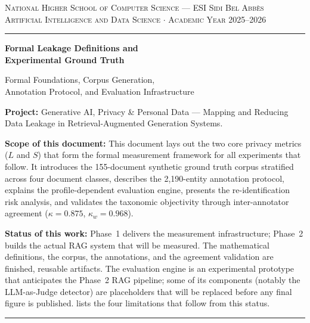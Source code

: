 \documentclass[12pt, a4paper]{article}
\begin{document}


\begin{titlepage}
\begin{center}

\vspace*{1.2cm}

{\small\color{steel}\textsc{National Higher School of Computer Science --- ESI Sidi Bel Abb\`{e}s}}\\[0.15cm]
{\small\color{steel}\textsc{Artificial Intelligence and Data Science $\cdot$ Academic Year 2025--2026}}

\vspace{0.5cm}
{\color{navy}\rule{\textwidth}{1.2pt}}
\vspace{1.6cm}

{\color{navy}\Huge\bfseries Formal Leakage Definitions and\\[0.3cm] Experimental Ground Truth}

\vspace{0.8cm}

{\color{steel}\large Formal Foundations, Corpus Generation,\\[0.1cm]
Annotation Protocol, and Evaluation Infrastructure}

\vspace{2cm}

\begin{prosebox}
{\small\textbf{Project:} Generative AI, Privacy \& Personal Data --- Mapping and Reducing Data Leakage in Retrieval-Augmented Generation Systems.

\medskip
\textbf{Scope of this document:} This document lays out the two core privacy metrics ($L$ and $S$) that form the formal measurement framework for all experiments that follow. It introduces the 155-document synthetic ground truth corpus stratified across four document classes, describes the 2{,}190-entity annotation protocol, explains the profile-dependent evaluation engine, presents the re-identification risk analysis, and validates the taxonomic objectivity through inter-annotator agreement ($\kappa = 0.875$, $\kappa_w = 0.968$).

\medskip
\textbf{Status of this work:} Phase~1 delivers the measurement infrastructure; Phase~2 builds the actual RAG system that will be measured. The mathematical definitions, the corpus, the annotations, and the agreement validation are finished, reusable artifacts. The evaluation engine is an experimental prototype that anticipates the Phase~2 RAG pipeline; some of its components (notably the LLM-as-Judge detector) are placeholders that will be replaced before any final figure is published.  lists the four limitations that follow from this status.}
\end{prosebox}

\vfill
{\color{navy}\rule{\textwidth}{1.2pt}}

\end{center}
\end{titlepage}
\end{document}

